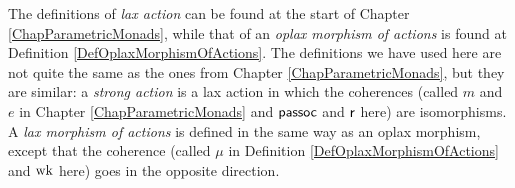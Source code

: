\begin{definition}
\begin{itemize}
  \end{itemize}
  \label{DefSequoidalCategory}
\end{definition}
\begin{remark}
  The definitions of \emph{lax action} can be found at the start of Chapter \ref{ChapParametricMonads}, while that of an \emph{oplax morphism of actions} is found at Definition \ref{DefOplaxMorphismOfActions}.  
  The definitions we have used here are not quite the same as the ones from Chapter \ref{ChapParametricMonads}, but they are similar: a \emph{strong action} is a lax action in which the coherences (called $m$ and $e$ in Chapter \ref{ChapParametricMonads} and $\operatorname{{\mathsf{passoc}}}$ and $\operatorname{{\mathsf{r}}}$ here) are isomorphisms.  
  A \emph{lax morphism of actions} is defined in the same way as an oplax morphism, except that the coherence (called $\mu$ in Definition \ref{DefOplaxMorphismOfActions} and $\operatorname{wk}$ here) goes in the opposite direction.
\end{remark}

